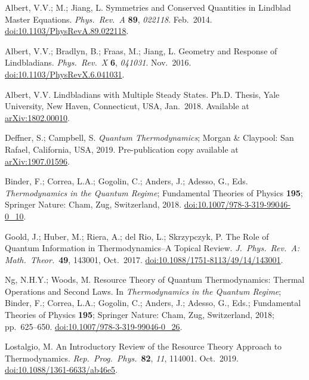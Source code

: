 \documentclass[preprints,article,accept,moreauthors,pdftex]{Definitions/mdpi}
\begin{document}
\begin{thebibliography}{999}
Albert, V.V.; M.; Jiang, L\@. Symmetries and Conserved Quantities in Lindblad Master Equations. {\em Phys.\ Rev.\ A} {\bf 89}, {\em 022118}. Feb.\ 2014. \href{https://doi.org/10.1103/PhysRevA.89.022118}{doi:10.1103/PhysRevA.89.022118}.

Albert, V.V.; Bradlyn, B.; Fraas, M.; Jiang, L\@. Geometry and Response of Lindbladians. {\em Phys.\ Rev.\ X} {\bf 6}, {\em 041031}. Nov.\ 2016. \href{https://doi.org/10.1103/PhysRevX.6.041031}{doi:10.1103/PhysRevX.6.041031}.

Albert, V.V\@. Lindbladians with Multiple Steady States. Ph.D. Thesis, Yale University, New Haven, Connecticut, USA, Jan.\ 2018. Available at \href{https://arxiv.org/abs/1802.00010}{arXiv:1802.00010}.

Deffner, S.; Campbell, S\@. \emph{Quantum Thermodynamics}; Morgan \& Claypool: San Rafael, California, USA, 2019. Pre-publication copy available at \href{https://arxiv.org/abs/1907.01596}{arXiv:1907.01596}.

Binder, F.; Correa, L.A.; Gogolin, C.; Anders, J.; Adesso, G., Eds. \emph{Thermodynamics in the Quantum Regime}; Fundamental Theories of Physics {\bf 195}; Springer Nature: Cham, Zug, Switzerland, 2018. \href{https://doi.org/10.1007/978-3-319-99046-0_10}{doi:10.1007/978-3-319-99046-0\_10}.

Goold, J.; Huber, M.; Riera, A.; del Rio, L.; Skrzypczyk, P\@. The Role of Quantum Information in Thermodynamics--A Topical Review. {\em J.\ Phys.\ Rev.\ A: Math.\ Theor.}\ {\bf 49}, 143001, Oct.\ 2017. \href{https://doi.org/10.1088/1751-8113/49/14/143001}{doi:10.1088/1751-8113/49/14/143001}.

Ng, N.H.Y.; Woods, M\@. Resource Theory of Quantum Thermodynamics: Thermal Operations and Second Laws. In \emph{Thermodynamics in the Quantum Regime}; Binder, F.; Correa, L.A.; Gogolin, C.; Anders, J.; Adesso, G., Eds.; Fundamental Theories of Physics {\bf 195}; Springer Nature: Cham, Zug, Switzerland, 2018; pp.~625--650. \href{https://doi.org/10.1007/978-3-319-99046-0_26}{doi:10.1007/978-3-319-99046-0\_26}.

Lostalgio, M\@. An Introductory Review of the Resource Theory Approach to Thermodynamics. {\em Rep.\ Prog.\ Phys.}\ {\bf 82}, {\em 11}, 114001. Oct.\ 2019. \href{https://doi.org/10.1088/1361-6633/ab46e5}{doi:10.1088/1361-6633/ab46e5}.


\end{thebibliography}
\end{document}
